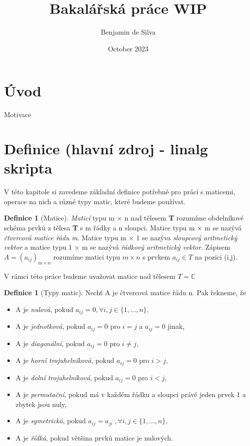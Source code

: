 \documentclass{article}
\title{Bakalářská práce WIP}
\author{Benjamin de Silva}
\date{October 2023}
\theoremstyle{plain}
\theoremstyle{definition}
\newtheorem{definice}[veta]{Definice}
\begin{document}
\maketitle
\newpage
\section*{Úvod}
Motivace
\newpage

\section{Definice (hlavní zdroj - linalg skripta}
V této kapitole si zavedeme základní definice potřebné pro práci s maticemi, operace na nich a různé typy matic, které budeme používat.

\begin{definice}[Matice]

\emph{Maticí} typu m $\times$ n nad tělesem \textbf{T} rozumíme obdelníkové schéma prvků z tělesa \textbf{T} s m řádky a n sloupci. Matice typu m $\times$ m se nazývá \emph{čtvercová matice řádu m}. Matice typu m $\times$ 1 se nazýva \emph{sloupcový aritmetický vektor} a matice typu 1 $\times$ m se nazývá \emph{řádkový aritmetický vektor}. Zápisem $A=(a_{ij})_{m\times n}$ rozumíme matici typu $m\times n$ s prvkem $a_{ij}\in T$ na pozici (i,j).
\end{definice}
    V rámci této práce budeme uvažovat matice nad tělesem $T=\mathbb{C}$

\begin{definice}[Typy matic]
Nechť A je čtvercová matice řádu n. Pak řekneme, že
\begin{itemize}
    \item A je \emph{nulová}, pokud $a_{ij}=0, \forall i,j \in\{1,...,n\}$,
    \item A je \emph{jednotková}, pokud $a_{ij}=0$ pro $i=j$ a $a_{ij}=0$ jinak,
    \item A je \emph{diagonální}, pokud $a_{ij}=0$ pro $i\neq j$,
    \item A je \emph{horní trojuhelníková}, pokud $a_{ij}=0$ pro $i>j$,
    \item A je \emph{dolní trojuhelníková}, pokud $a_{ij}=0$ pro $i<j$,
    \item A je \emph{permutační}, pokud má v každém řádku a sloupci právě jeden prvek 1 a zbytek jsou nuly,
    \item A je \emph{symetrická}, pokud $a_{ij}=a_{ji}\;, \forall i,j \in\{1,...,n\}$,
    \item A je \emph{řídká}, pokud většina prvků matice je nulových.
\end{itemize}
\end{definice}
\end{document}
